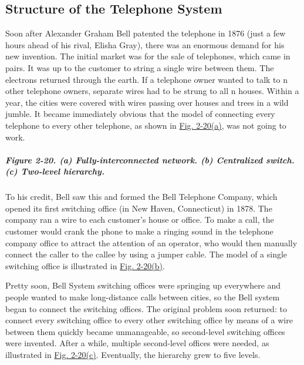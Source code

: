 \documentclass[b5paper,11pt]{memoir}
\begin{document}
\subsection{Structure of the Telephone System}

Soon after Alexander Graham Bell patented the telephone in 1876 (just a
few hours ahead of his rival, Elisha Gray), there was an enormous demand
for his new invention. The initial market was for the sale of
telephones, which came in pairs. It was up to the customer to string a
single wire between them. The electrons returned through the earth. If a
telephone owner wanted to talk to {n} other telephone owners, separate
wires had to be strung to all {n} houses. Within a year, the cities were
covered with wires passing over houses and trees in a wild jumble. It
became immediately obvious that the model of connecting every telephone
to every other telephone, as shown in
\protect\hyperlink{0130661023_ch02lev1sec5.htmlux5cux23ch02fig20}{Fig.
2-20(a)}, was not going to work.

\subparagraph[Figure 2-20. (a) Fully-interconnected network. (b)
Centralized switch. (c) Two-level
hierarchy.]{\texorpdfstring{\protect\hypertarget{0130661023_ch02lev1sec5.htmlux5cux23ch02fig20}{}{}Figure
2-20. (a) Fully-interconnected network. (b) Centralized switch. (c)
Two-level
hierarchy.}{Figure 2-20. (a) Fully-interconnected network. (b) Centralized switch. (c) Two-level hierarchy.}}


To his credit, Bell saw this and formed the Bell Telephone Company,
which opened its first switching office (in New Haven, Connecticut) in
1878. The company ran a wire to each customer's house or office. To make
a call, the customer would crank the phone to make a ringing sound in
the telephone company office to attract the attention of an operator,
who would then manually connect the caller to the callee by using a
jumper cable. The model of a single switching office is illustrated in
\protect\hyperlink{0130661023_ch02lev1sec5.htmlux5cux23ch02fig20}{Fig.
2-20(b)}.

Pretty soon, Bell System switching offices were springing up everywhere
and people wanted to make long-distance calls between cities, so the
Bell system began to connect the switching offices. The original problem
soon returned: to connect every switching office to every other
switching office by means of a wire between them quickly became
unmanageable, so second-level switching offices were invented. After a
while, multiple second-level offices were needed, as illustrated in
\protect\hyperlink{0130661023_ch02lev1sec5.htmlux5cux23ch02fig20}{Fig.
2-20(c)}. Eventually, the hierarchy grew to five levels.
\end{document}

